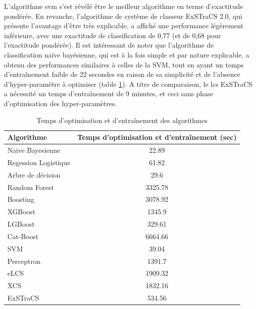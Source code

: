 L'algorithme \gls{svm} s'est révélé être le meilleur algorithme en terme d'exactitude pondérée. En revanche, l'algorithme de système de classeur ExSTraCS 2.0, qui présente l'avantage d'être très explicable, a affiché une performance légèrement inférieure, avec une exactitude de classification de 0,77 (et de 0,68 pour l'exactitude pondérée). Il est intéressant de noter que l'algorithme de classification naïve bayésienne, qui est à la fois simple et par nature explicable, a obtenu des performances similaires à celles de la SVM, tout en ayant un temps d'entraînement faible de 22 secondes en raison de sa simplicité et de l'absence d'hyper-paramètre à optimiser (table \ref{tab:pipeline_times}). A titre de comparaison, le \gls{lcs} ExSTraCS a nécessité un temps d'entraînement de 9 minutes, et ceci sans phase d'optimisation des hyper-paramètres.
\begin{table}[!ht]
    \centering
    \begin{tabular}{lc}
        \toprule
        Algorithme & Temps d'optimisation et d'entraînement (sec) \\
        \midrule
        Naive Bayesienne & 22.89 \\
        Regession Logistique & 61.82 \\
        Arbre de décision & 29.6 \\
        Random Forest & 3325.78 \\
        Boosting & 3078.92 \\
        XGBoost & 1345.9 \\
        LGBoost & 329.61 \\
        Cat-Boost & 6664.66 \\
        SVM & 39.04 \\
        Perceptron & 1391.7 \\
        eLCS & 1909.32 \\
        XCS & 1832.16 \\
        ExSTraCS & 534.56 \\
        \bottomrule
    \end{tabular}
    \caption{Temps d'optimisation et d'entraînement des algorithmes}
    \label{tab:pipeline_times}
\end{table}
